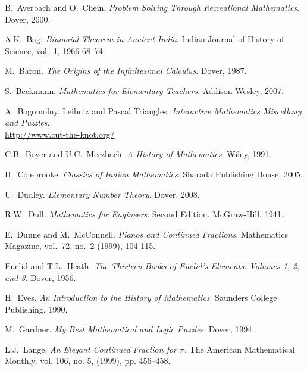 


\begin{fullwidth}

\begin{thebibliography}{99}

 B.\ Averbach and O.\ Chein. \emph{Problem Solving Through Recreational Mathematics}. Dover, 2000.

 A.K.\ Bag. \emph{Binomial Theorem in Ancient India}. Indian Journal of History of Science, vol.\ 1,  1966 68--74. 

 M.\ Baron. \emph{The Origins of the Infinitesimal Calculus}. Dover, 1987.

 S.\ Beckmann. \emph{Mathematics for Elementary
  Teachers}. Addison Wesley, 2007.

 A.\ Bogomolny. Leibniz and Pascal Triangles. \emph{Interactive Mathematics Miscellany and Puzzles}.
\\ \url{http://www.cut-the-knot.org/}

 C.B.\ Boyer and U.C.\ Merzbach. \emph{A History of Mathematics}. Wiley, 1991.

 H.\ Colebrooke. \emph{Classics of Indian Mathematics}. 
Sharada Publishing House, 2005.

 U.\ Dudley. \emph{Elementary Number Theory}. Dover,
  2008.

 R.W.\ Dull. \emph{Mathematics for Engineers}. Second
  Edition. McGraw-Hill, 1941.

E.\ Dunne and M.\ McConnell. \emph{Pianos and Continued
Fractions}. Mathematics Magazine, vol.\ 72, no.\ 2 (1999), 104-115.

 Euclid and T.L.\ Heath. \emph{The Thirteen Books of Euclid's Elements: Volumes 1, 2, and 3}. Dover, 1956. 

 H.\ Eves. \emph{An Introduction to the History of Mathematics}. Saunders College Publishing, 1990.

 M.\ Gardner. \emph{My Best Mathematical and Logic
  Puzzles}. Dover, 1994.

 L.J.\ Lange. \emph{An Elegant Continued Fraction for {$\pi$}}. The American Mathematical Monthly, vol. 106, no. 5, (1999), pp. 456--458.


\end{thebibliography}
\end{fullwidth}
